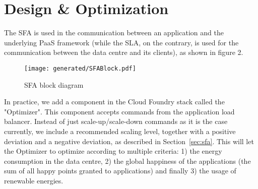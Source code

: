 \section{Design \& Optimization}
\label{sec:implem}

The SFA is used in the communication between an application and the underlying PaaS framework (while the SLA, on the contrary, is used for the communication between the data centre and its clients), as shown in figure 2.

\begin{figure}[t]
\label{fig:SFABlock}
\centering
\texttt{[image: generated/SFABlock.pdf]}
\caption{SFA block diagram}
\end{figure}

In practice, we add a component in the Cloud Foundry stack called the "Optimizer".
This component accepts commands from the application load balancer.
Instead of just scale-up/scale-down commands as it is the case currently, we include a recommended scaling level, together with a positive deviation and a negative deviation, as described in Section~\ref{sec:sfa}.
This will let the Optimizer to optimize according to multiple criteria: 1) the energy consumption in the data centre, 2) the global happiness of the applications (the sum of all happy points granted to applications) and finally 3) the usage of renewable energies.

